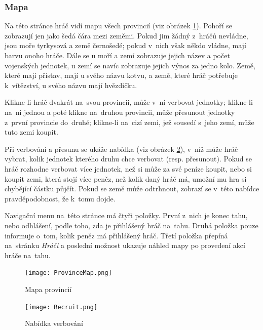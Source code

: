 \documentclass[a4paper,12pt]{article}
\begin{document}
\subsubsection{Mapa}
Na této stránce hráč vidí mapu všech provincií (viz obrázek \ref{map}). Pohoří se zobrazují jen jako šedá čára mezi zeměmi. Pokud jim žádný z~hráčů nevládne, jsou moře tyrkysová a země černošedé; pokud v~nich však někdo vládne, mají barvu onoho hráče. Dále se u moří a zemí zobrazuje jejich název a počet vojenských jednotek, u zemí se navíc zobrazuje jejich výnos za jedno kolo. Země, které mají přístav, mají u svého názvu kotvu, a země, které hráč potřebuje k~vítězství, u svého názvu mají hvězdičku.

Klikne-li hráč dvakrát na~svou provincii, může v~ní verbovat jednotky; klikne-li na~ni jednou a poté klikne na~druhou provincii, může přesunout jednotky z~první provincie do~druhé; klikne-li na~cizí zemi, jež sousedí s~jeho zemí, může tuto zemi koupit.

Při verbování a přesunu se ukáže nabídka (viz obrázek \ref{recruit}), v~níž může hráč vybrat, kolik jednotek kterého druhu chce verbovat (resp. přesunout). Pokud se hráč rozhodne verbovat více jednotek, než si může za své peníze koupit, nebo si koupit zemi, která stojí více peněz, než kolik daný hráč má, umožní mu hra si chybějící částku půjčít. Pokud se země může odtrhnout, zobrazí se v~této nabídce pravděpodobnost, že k~tomu dojde.

Navigační menu na~této stránce má čtyři položky. První z~nich je konec tahu, nebo odhlášení, podle toho, zda je přihlášený hráč na~tahu. Druhá položka pouze informuje o~tom, kolik peněz má přihlášený hráč. Třetí položka přepíná na~stránku \textit{Hráči} a poslední možnost ukazuje náhled mapy po provedení akcí hráče na~tahu.

\begin{figure}[H]
	\texttt{[image: ProvinceMap.png]}
	\caption{Mapa provincií}
	\label{map}
\end{figure}
\begin{figure}[H]
	\texttt{[image: Recruit.png]}
	\caption{Nabídka verbování}
	\label{recruit}
\end{figure}
\end{document}
